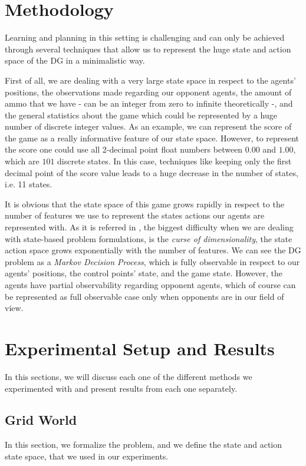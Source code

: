 \documentclass[conference]{IEEEtran}
\begin{document}
\section{Methodology}
Learning and planning in this setting is challenging and can only be achieved through several techniques that allow us to represent the huge state and action space of the DG in a minimalistic way. 

First of all, we are dealing with a very large state space in respect to the agents' positions, the observations made regarding our opponent agents, the amount of ammo that we have - can be an integer from zero to infinite theoretically -, and the general statistics about the game which could be represented by a huge number of discrete integer values. As an example, we can represent the score of the game as a really informative feature of our state space. However, to represent the score one could use all 2-decimal point float numbers between $0.00$ and $1.00$, which are $101$ discrete states. 
In this case, techniques like keeping only the first decimal point of the score value leads to a huge decrease in the number of states, i.e. 11 states. 

It is obvious that the state space of this game grows rapidly in respect to the number of features we use to represent the states actions our agents are represented with. As it is referred in \cite{boutilier}, the biggest difficulty when we are dealing with state-based problem formulations, is the \textit{curse of dimensionality}, the state action space grows exponentially with the number of features. We can see the DG problem as a \textit{Markov Decision Process}, which is fully observable in respect to our agents' positions, the control points' state, and the game state. However, the agents have partial observability regarding opponent agents, which of course can be represented as full observable case only when opponents are in our field of view.

\section{Experimental Setup and Results}
In this sections, we will discuss each one of the different methods we experimented with and present results from each one separately.
\subsection{Grid World}
In this section, we formalize the problem, and we define the state and action state space, that we used in our experiments.
\end{document}
